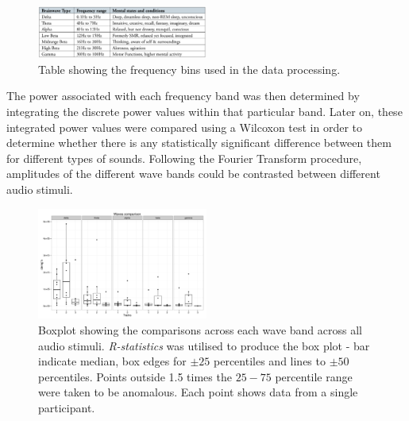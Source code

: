 \documentclass[twocolumn,superscriptaddress]{revtex4-1}
\theoremstyle{definition}
\theoremstyle{remark}
\begin{document}
     \begin{figure}[h!]
  \centering
      \includegraphics[width=0.5\textwidth]{brainwavespic.png}
  \caption{\label{bins} Table showing the frequency bins used in the data processing.}
  \label{wavecomp}
\end{figure}

The power associated with each frequency band was then determined by integrating the discrete power values within that particular band. Later on, these integrated power values were compared using a Wilcoxon test in order to determine whether there is any statistically significant difference between them for different types of sounds. Following the Fourier Transform procedure, amplitudes of the different wave bands could be contrasted between different audio stimuli.   \\

\begin{figure}[h!]
  \centering
      \includegraphics[width=0.5\textwidth]{compare_waves}
  \caption{Boxplot showing the comparisons across each wave band across all audio stimuli. \emph{R-statistics} was utilised to produce the box plot - bar indicate median, box edges for $\pm 25$ percentiles and lines to $\pm 50$ percentiles. Points outside 1.5 times the $25-75$ percentile range were taken to be anomalous. Each point shows data from a single participant.}
  \label{wavecomp}
\end{figure}
\end{document}
